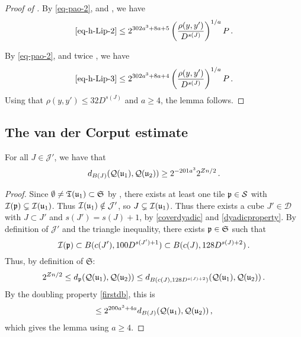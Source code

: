 \begin{proof}[Proof of ]
        By \eqref{eq-pao-2},  and , we have
        $$
            \eqref{eq-h-Lip-2} \le 2^{302a^3+8a+5} \left(\frac{\rho(y,y')}{D^{s(J)}}\right)^{1/a} P\,.
        $$

        By \eqref{eq-pao-2}, and twice , we have
        $$
            \eqref{eq-h-Lip-3} \le 2^{302a^3+8a+4} \left(\frac{\rho(y,y')}{D^{s(J)}}\right)^{1/a} P\,.
        $$
        Using that $\rho(y,y') \le 32D^{s(J)}$ and $a \ge 4$, the lemma follows.
    \end{proof}

\subsection{The van der Corput estimate}
\label{subsubsec-van-der-corput}
    \begin{lemma}
        \label{lower-oscillation-bound}
        \leanok
        For all $J \in \mathcal{J}'$, we have that
        $$
            d_{B(J)}({\mathcal{Q}}({\mathfrak u}_1), {\mathcal{Q}}({\mathfrak u}_2)) \ge 2^{-201a^3} 2^{Zn/2}\,.
        $$
    \end{lemma}

    \begin{proof}
    \leanok
    Since $\emptyset \ne {\mathfrak T}({\mathfrak u}_1) \subset \mathfrak{S}$ by , there exists at least one tile ${\mathfrak p} \in \mathcal{S}$ with ${\mathcal{I}}({\mathfrak p}) \subsetneq {\mathcal{I}}({\mathfrak u}_1)$. Thus ${\mathcal{I}}({\mathfrak u}_1) \notin \mathcal{J}'$, so $J \subsetneq {\mathcal{I}}({\mathfrak u}_1)$. Thus there exists a cube $J' \in \mathcal{D}$ with $J \subset J'$ and $s(J') = s(J) + 1$, by \eqref{coverdyadic} and \eqref{dyadicproperty}. By definition of $\mathcal{J'}$ and the triangle inequality, there exists ${\mathfrak p} \in \mathfrak{S}$ such that
    $$
        {\mathcal{I}}({\mathfrak p}) \subset B(c(J'), 100 D^{s(J') + 1}) \subset B(c(J), 128 D^{s(J)+2})\,.
    $$
    Thus, by definition of $\mathfrak{S}$:
    \begin{align*}
        2^{Zn/2} \le d_{{\mathfrak p}}({\mathcal{Q}}({\mathfrak u}_1), {\mathcal{Q}}({\mathfrak u}_2)) \le d_{B(c(J), 128 D^{s(J)+2})}({\mathcal{Q}}({\mathfrak u}_1), {\mathcal{Q}}({\mathfrak u}_2))\,.
    \end{align*}
    By the doubling property \eqref{firstdb}, this is
    $$
        \le 2^{200a^3 + 4a} d_{B(J)}({\mathcal{Q}}({\mathfrak u}_1), {\mathcal{Q}}({\mathfrak u}_2))\,,
    $$
    which gives the lemma using $a \ge 4$.
    \end{proof}

